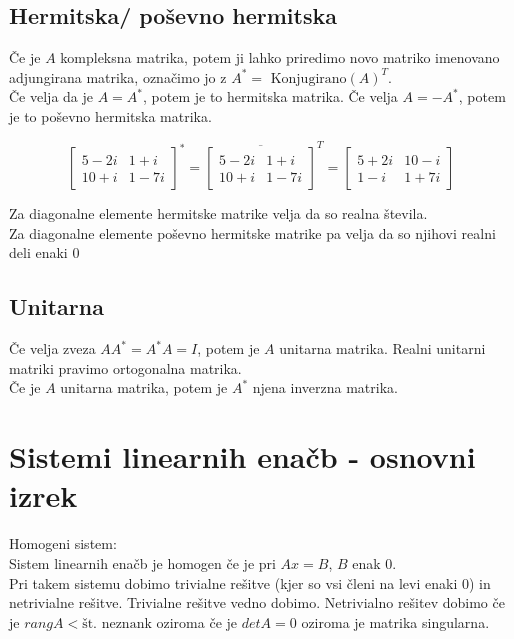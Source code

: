 \documentclass[12pt]{report}
\begin{document}
\subsection*{Hermitska/ poševno hermitska}

Če je $A$ kompleksna matrika, potem ji lahko priredimo novo matriko imenovano adjungirana matrika, označimo jo z $A^*=\text{ Konjugirano}(A)^T$.   \\
Če velja da je $A=A^*$, potem je to hermitska matrika. Če velja $A=-A^*$, potem je to poševno hermitska matrika.

\[\begin{bmatrix} 5-2i & 1+i \\ 10+i & 1-7i \end{bmatrix}^* = \overline{\begin{bmatrix} 5-2i & 1+i \\ 10+i & 1-7i \end{bmatrix}}^T = \begin{bmatrix} 5+2i & 10-i \\ 1-i & 1+7i \end{bmatrix}\]

Za diagonalne elemente hermitske matrike velja da so realna števila.\\
Za diagonalne elemente poševno hermitske matrike pa velja da so njihovi realni deli enaki 0 


\subsection*{Unitarna}

Če velja zveza $AA^*=A^*A=I$, potem je $A$ unitarna matrika. Realni unitarni matriki pravimo ortogonalna matrika. \\
Če je $A$ unitarna matrika, potem je $A^*$ njena inverzna matrika.


\section*{Sistemi linearnih enačb - osnovni izrek}

Homogeni sistem:\\
Sistem linearnih enačb je homogen če je pri $Ax=B$, $B$ enak 0.\\
Pri takem sistemu dobimo trivialne rešitve (kjer so vsi členi na levi enaki 0) in netrivialne rešitve. Trivialne rešitve vedno dobimo. Netrivialno rešitev dobimo če je $rangA < \text{št. neznank}$ oziroma če je $detA = 0 $ oziroma je matrika singularna.
\end{document}
